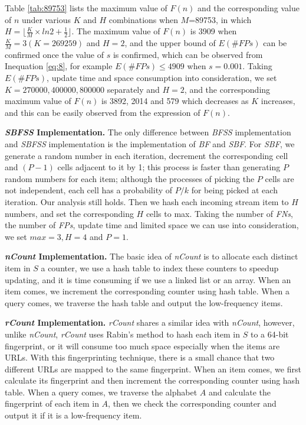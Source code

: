 \documentclass[conference]{IEEEtran}
\begin{document}
Table \ref{tab:89753} lists the maximum value of $F(n)$ and the corresponding value of $n$ under various $K$ and $H$ combinations when $M$=89753, in which $H=\lfloor\frac{K}{M}\times ln2+\frac{1}{2}\rfloor$. The maximum value of $F(n)$ is 3909 when $\frac{K}{M}=3(K=269259)$ and $H=2$, and the upper bound of $E(\#FPs)$ can be confirmed once the value of $s$ is confirmed, which can be observed from Inequation \ref{eq:8}, for example $E(\#FPs)\leq 4909$ when $s=0.001$. Taking $E(\#FPs)$, update time and space consumption into consideration, we set $K=270000,400000,800000$ separately and $H=2$, and the corresponding maximum value of $F(n)$ is 3892, 2014 and 579 which decreases as $K$ increases, and this can be easily observed from the expression of $F(n)$.\par

\textbf{\emph{SBFSS} Implementation.} The only difference between \emph{BFSS} implementation and \emph{SBFSS} implementation is the implementation of \emph{BF} and \emph{SBF}. For \emph{SBF}, we generate a random number in each iteration, decrement the corresponding cell and $(P-1)$ cells adjacent to it by 1; this process is faster than generating $P$ random numbers for each item; although the processes of picking the $P$ cells are not independent, each cell has a probability of $P/k$ for being picked at each iteration. Our analysis still holds. Then we hash each incoming stream item to $H$ numbers, and set the corresponding $H$ cells to max. Taking the number of \emph{FNs}, the number of \emph{FPs}, update time and limited space we can use into consideration, we set $max=3, H=4$ and $P=1$.\par

\textbf{\emph{nCount} Implementation.} The basic idea of \emph{nCount} is to allocate each distinct item in $S$ a counter, we use a hash table to index these counters to speedup updating, and it is time consuming if we use a linked list or an array. When an item comes, we increment the corresponding counter using hash table. When a query comes, we traverse the hash table and output the low-frequency items. \par

\textbf{\emph{rCount} Implementation.} \emph{rCount} shares a similar idea with \emph{nCount}, however, unlike \emph{nCount}, \emph{rCount} uses Rabin's method \cite{rabin1981fingerprinting} to hash each item in $S$ to a 64-bit fingerprint, or it will consume too much space especially when the items are URLs. With this fingerprinting technique, there is a small chance that two diﬀerent URLs are mapped to the same fingerprint. When an item comes, we first calculate its fingerprint and then increment the corresponding counter using hash table. When a query comes, we traverse the alphabet $A$ and calculate the fingerprint of each item in $A$, then we check the corresponding counter and output it if it is a low-frequency item.\par
\end{document}
